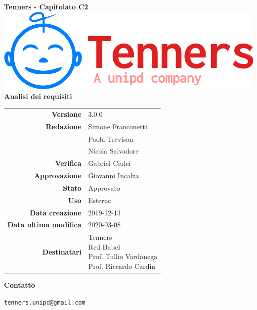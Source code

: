 \begin{titlepage}
	\begin{center}
		\large \textbf{Tenners - Capitolato C2}
		\vfill
		\includegraphics[scale = 0.3]{./res/img/logo.png}\\
		\vfill
		\Huge \textbf{Analisi dei requisiti}

        \vfill
        \large

        \begin{tabular}{r|l}
                        \textbf{Versione} & 3.0.0 \\
                        \textbf{Redazione} &
                        Simone Franconetti\\&
                        Paola Trevisan \\&
						Nicola Salvadore \\
                        \textbf{Verifica} &
                        Gabriel Ciulei \\
                        \textbf{Approvazione} & Giovanni Incalza \\
                        \textbf{Stato} & Approvato \\
                        \textbf{Uso} & Esterno\\
                        \textbf{Data creazione} & 2019-12-13\\
                        \textbf{Data ultima modifica} & 2020-03-08\\
                        \textbf{Destinatari} & \parbox[t]{5cm}{Tenners\\Red Babel\\Prof. Tullio Vardanega\\Prof. Riccardo Cardin}
                \end{tabular}
                \vfill
                \normalsize
                \vfill
                \textbf{Contatto}

                \texttt{tenners.unipd@gmail.com}

	\end{center}
\end{titlepage}
